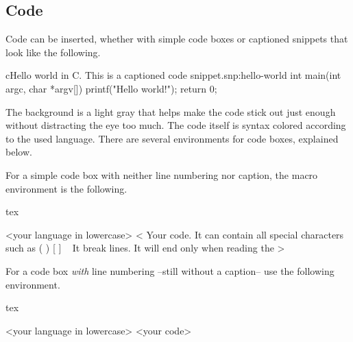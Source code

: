 \documentclass[
	raggedright,
	twoside,
	12pt,
	colorful,
]{tufte-style-article}
\begin{document}
\newpage

\subsection{Code}
\label{sub:code}

Code can be inserted, whether with simple code boxes or captioned snippets that look like the following.
\begin{snippet}{c}{Hello world in C. This is a captioned code snippet.}{snp:hello-world}
int main(int argc, char *argv[]) {
	printf("Hello world!");
	return 0;
}
\end{snippet}

The background is a light gray that helps make the code stick out just enough without distracting the eye too much. The code itself is syntax colored according to the used language. There are several environments for code boxes, explained below.

For a simple code box with neither line numbering nor caption, the macro environment is the following.

%
\begin{altcodebox}{tex}
\begin{codebox}{<your language in lowercase>}
<
Your code. It can contain all special characters such as { } ( ) [ ] \ %
It break lines.
It will end only when reading the %
>
\end{codebox}
\end{altcodebox}

For a code box \textit{with} line numbering --still without a caption-- use the following environment.
\begin{altcodebox}{tex}
\begin{codeboxnum}{<your language in lowercase>}
<your code>
\end{codeboxnum}
\end{altcodebox}
\end{document}
